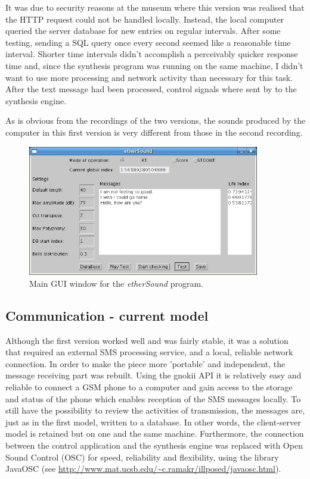It was due to security reasons at the museum where this version was realised that the HTTP request could not be handled locally. Instead, the local computer queried the server database for new entries on regular intervals.  After some testing, sending a SQL query once every second seemed like a reasonable time interval. Shorter time intervals didn't accomplish a perceivably quicker response time and, since the synthesis program was running on the same machine, I didn't want to use more processing and network activity than necessary for this task. After the text message had been processed, control signals where sent by  to the synthesis engine. 

As is obvious from the recordings of the two versions, the sounds produced by the computer in this first version is very different from those in the second recording.

\begin{figure}[hbp]
  \begin{center}
    \includegraphics[width=0.9\textwidth]{img/ethsnd/MainGUI}
  \caption{Main GUI window for the \emph{etherSound} program.}
  \label{fig:main_gui}
\end{center}
\end{figure}

\subsection{Communication - current model}
Although the first version worked well and was fairly stable, it was a solution that required an external SMS processing service, and a local, reliable network connection. In order to make the piece more 'portable' and independent, the message receiving part was rebuilt. Using the gnokii API \citep{gnokii} it is relatively easy and reliable to connect a GSM phone to a computer and gain access to the storage and status of the phone which enables reception of the SMS messages locally. To still have the possibility to review the activities of transmission, the messages are, just as in the first model, written to a database. In other words, the client-server model is retained but on one and the same machine. Furthermore, the  connection between the control application and the synthesis engine was replaced with Open Sound Control (OSC) \citep{osc, osc_web} for speed, reliability and flexibility, using the library JavaOSC (see \url{http://www.mat.ucsb.edu/~c.ramakr/illposed/javaosc.html}). 

